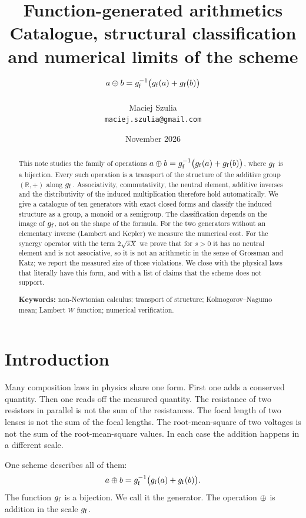 \documentclass[11pt,a4paper]{article}
\title{\textbf{Function-generated arithmetics}\\[2pt]
\large Catalogue, structural classification and numerical limits of the scheme
$a \mathbin{\oplus} b = g_{\mathrm{f}}^{-1}\big(g_{\mathrm{f}}(a)+g_{\mathrm{f}}(b)\big)$}
\author{Maciej Szulia\\[2pt]\normalsize\texttt{maciej.szulia@gmail.com}}
\date{November 2026}
\begin{document}
\maketitle

\begin{abstract}
\noindent
This note studies the family of operations $a\mathbin{\oplus} b=g_{\mathrm{f}}^{-1}\big(g_{\mathrm{f}}(a)+g_{\mathrm{f}}(b)\big)$,
where $g_{\mathrm{f}}$ is a bijection. Every such operation is a transport of the structure
of the additive group $(\mathbb{R},+)$ along $g_{\mathrm{f}}$. Associativity, commutativity,
the neutral element, additive inverses and the distributivity of the induced
multiplication therefore hold automatically. We give a catalogue of ten
generators with exact closed forms and classify the induced structure as a
group, a monoid or a semigroup. The classification depends on the image of
$g_{\mathrm{f}}$, not on the shape of the formula. For the two generators without an
elementary inverse (Lambert and Kepler) we measure the numerical cost. For the
synergy operator with the term $2\sqrt{sX}$ we prove that for $s>0$ it has no
neutral element and is not associative, so it is not an arithmetic in the sense
of Grossman and Katz; we report the measured size of those violations. We close
with the physical laws that literally have this form, and with a list of claims
that the scheme does not support.

\smallskip
\noindent\textbf{Keywords:} non-Newtonian calculus; transport of structure;
Kolmogorov--Nagumo mean; Lambert $W$ function; numerical verification.
\end{abstract}

\section{Introduction}

Many composition laws in physics share one form. First one adds a conserved
quantity. Then one reads off the measured quantity. The resistance of two
resistors in parallel is not the sum of the resistances. The focal length of two
lenses is not the sum of the focal lengths. The root-mean-square of two voltages
is not the sum of the root-mean-square values. In each case the addition happens
in a different scale.

One scheme describes all of them:
\begin{equation}
\label{eq:base}
a\mathbin{\oplus} b=g_{\mathrm{f}}^{-1}\big(g_{\mathrm{f}}(a)+g_{\mathrm{f}}(b)\big).
\end{equation}
The function $g_{\mathrm{f}}$ is a bijection. We call it the generator. The operation $\mathbin{\oplus}$
is addition in the scale $g_{\mathrm{f}}$.
\end{document}
